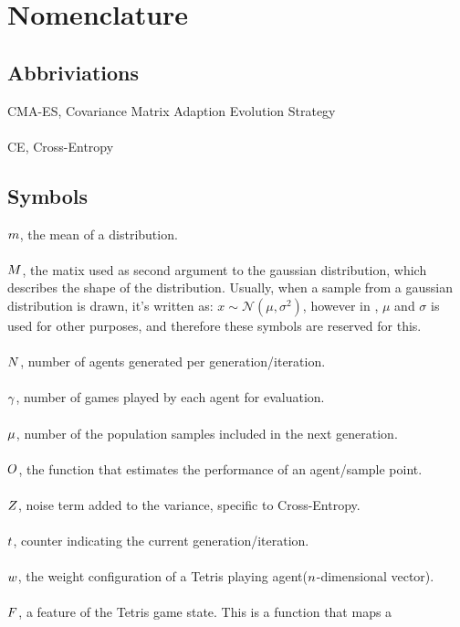 \section{Nomenclature}

\subsection{Abbriviations}
CMA-ES, Covariance Matrix Adaption Evolution Strategy\\
\\
CE, Cross-Entropy

\subsection{Symbols}

$m$, the mean of a distribution.\\
\\
$M$, the matix used as 
second argument to the gaussian distribution, 
which describes the shape of the distribution. 
Usually, when a sample from a gaussian distribution 
is drawn, it's written as: 
$x \sim \mathcal{N} \left( \mu, \sigma^{2} \right)$, 
however in \citep{hansen2011},
$\mu$ and $\sigma$ is used for other 
purposes, and therefore these symbols are reserved for this.\\
\\
$N$, number of agents generated per generation/iteration.\\
\\
$\gamma$, number of games played by each agent for evaluation.\\
\\
$\mu$, number of the population samples included in the next generation.\\
\\
$O$, the function that estimates the performance of an agent/sample point.\\
\\
$Z$, noise term added to the variance, specific to Cross-Entropy.\\
\\
$t$, counter indicating the current generation/iteration.\\
\\
$w$, the weight configuration of a Tetris playing agent($n $-dimensional vector).\\
\\
$F$, a feature of the Tetris game state. This is a function that maps a 
